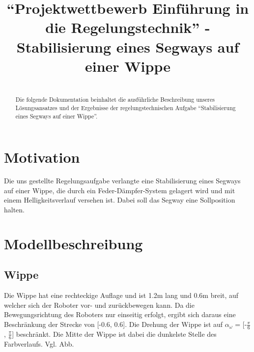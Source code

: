 \documentclass[pdf]{ifacconf}
\begin{document}
\begin{frontmatter}

\title{``Projektwettbewerb Einführung in die Regelungstechnik'' - Stabilisierung eines Segways auf einer Wippe}


\textbf{}

\begin{abstract}\\                          %
Die folgende Dokumentation beinhaltet die ausführliche Beschreibung unseres Lösungsansatzes und der Ergebnisse der regelungstechnischen Aufgabe ``Stabilisierung eines Segways auf einer Wippe''. 
\end{abstract}

\end{frontmatter}

\section{Motivation}
Die uns gestellte Regelungsaufgabe verlangte eine Stabilisierung eines Segways auf einer Wippe, die durch ein Feder-Dämpfer-System gelagert wird und mit einem Helligkeitsverlauf versehen ist. Dabei soll das Segway eine Sollposition halten. 

\section{Modellbeschreibung}

	\subsection{Wippe}
	Die Wippe hat eine rechteckige Auflage und ist 1.2m lang und 0.6m breit, auf 			welcher sich der Roboter vor- und zurückbewegen kann.
	Da die Bewegungsrichtung des Roboters nur einseitig erfolgt, ergibt sich daraus 		eine Beschränkung der Strecke von [-0.6, 0.6].
	Die Drehung der Wippe ist auf $\alpha^{}_{\omega}$ = [-$\frac{\pi}{6}$, $\frac{\pi}{6}$] beschränkt.
	Die Mitte der Wippe ist dabei die dunkelste Stelle des Farbverlaufs. Vgl. Abb. 
\end{document}
